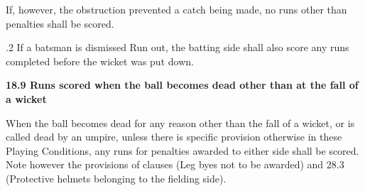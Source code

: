 \documentclass[12pt]{article}
\begin{document}
\vspace{\baselineskip}
\begin{adjustwidth}{0.5in}{0.0in}
{\fontsize{9pt}{10.8pt}\selectfont If, however, the obstruction prevented a catch being made, no runs other than penalties shall be scored.\par}\par

\end{adjustwidth}


\vspace{\baselineskip}
\begin{adjustwidth}{0.5in}{0.21in}
{\fontsize{9pt}{10.8pt}.2 \tabto{0.49in} If a batsman is dismissed Run out, the batting side shall also score any runs completed before the wicket was put down.\par}\par

\end{adjustwidth}


\vspace{\baselineskip}

\vspace{\baselineskip}

\vspace{\baselineskip}

\vspace{\baselineskip}

\vspace{\baselineskip}

\vspace{\baselineskip}

\vspace{\baselineskip}

\vspace{\baselineskip}
\begin{Center}
{\fontsize{8pt}{9.6pt}\par}
\end{Center}\par


\vspace{\baselineskip}
{\fontsize{11pt}{13.2pt}\selectfont \textbf{18.9 \tabto{0.47in} Runs scored when the ball becomes dead other than at the fall of a wicket}\par}\par


\vspace{\baselineskip}
\begin{adjustwidth}{0.0in}{0.14in}
{\fontsize{9pt}{10.8pt}\selectfont When the ball becomes dead for any reason other than the fall of a wicket, or is called dead by an umpire, unless there is specific provision otherwise in these Playing Conditions, any runs for penalties awarded to either side shall be scored. Note however the provisions of clauses (Leg byes not to be awarded) and 28.3 (Protective helmets belonging to the fielding side).\par}\par

\end{adjustwidth}
\end{document}
